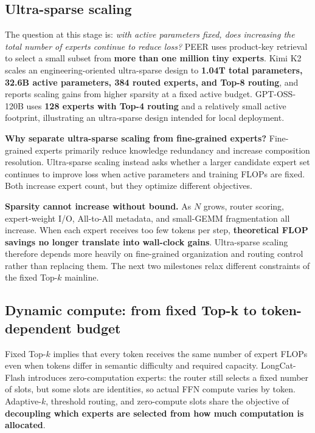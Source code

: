 \documentclass[10pt,a4paper,fontset=none]{ctexart}
\newcommand{\term}[1]{\textbf{#1}}
\begin{document}
\subsection{Ultra-sparse scaling}

The question at this stage is: \emph{with active parameters fixed, does increasing the total number of experts continue to reduce loss?} PEER uses product-key retrieval to select a small subset from \textbf{more than one million tiny experts}\cite{en:he2024peer}. Kimi K2 scales an engineering-oriented ultra-sparse design to \textbf{1.04T total parameters, 32.6B active parameters, 384 routed experts, and Top-8 routing}, and reports scaling gains from higher sparsity at a fixed active budget\cite{en:kimiK2}. GPT-OSS-120B uses \textbf{128 experts with Top-4 routing} and a relatively small active footprint, illustrating an ultra-sparse design intended for local deployment\cite{en:openaiGptOss}.

\textbf{Why separate ultra-sparse scaling from fine-grained experts?} Fine-grained experts primarily reduce knowledge redundancy and increase composition resolution. Ultra-sparse scaling instead asks whether a larger candidate expert set continues to improve loss when active parameters and training FLOPs are fixed. Both increase expert count, but they optimize different objectives.

\term{Sparsity cannot increase without bound.} As $N$ grows, router scoring, expert-weight I/O, All-to-All metadata, and small-GEMM fragmentation all increase. When each expert receives too few tokens per step, \textbf{theoretical FLOP savings no longer translate into wall-clock gains}. Ultra-sparse scaling therefore depends more heavily on fine-grained organization and routing control rather than replacing them. The next two milestones relax different constraints of the fixed Top-$k$ mainline.

\subsection{Dynamic compute: from fixed Top-k to token-dependent budget}

Fixed Top-$k$ implies that every token receives the same number of expert FLOPs even when tokens differ in semantic difficulty and required capacity. LongCat-Flash introduces zero-computation experts: the router still selects a fixed number of slots, but some slots are identities, so actual FFN compute varies by token\cite{en:longcatFlash}. Adaptive-$k$, threshold routing, and zero-compute slots share the objective of \term{decoupling which experts are selected from how much computation is allocated}.
\end{document}
